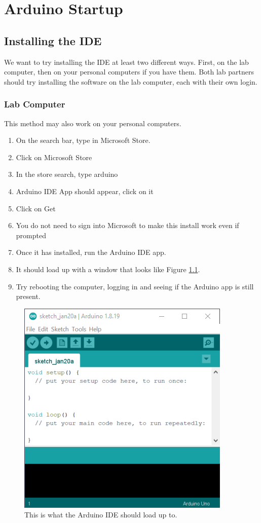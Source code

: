 \chapter{Arduino Startup}

\section{Installing the IDE}
We want to try installing the IDE at least two different ways. First, on the lab computer, then on your personal
computers if you have them. Both lab partners should try installing the software on the lab computer, each with 
their own login.

\subsection{Lab Computer}
This method may also work on your personal computers.
\begin{enumerate}
    \item On the search bar, type in Microsoft Store.
    \item Click on Microsoft Store
    \item In the store search, type arduino
    \item Arduino IDE App should appear, click on it
    \item Click on Get
    \item You do not need to sign into Microsoft to make this install work even if prompted
    \item Once it has installed, run the Arduino IDE app. 
	\item It should load up with a window that looks like Figure \ref{fig:emptysketch}.
	\item Try rebooting the computer, logging in and seeing if the Arduino app is still present.
\end{enumerate}

\begin{figure}[!htb]
	\centering
	\includegraphics[scale=1.0]{arduinoStart/emptysketch.PNG}
	\caption{This is what the Arduino IDE should load up to.}
	\label{fig:emptysketch}
\end{figure} 

